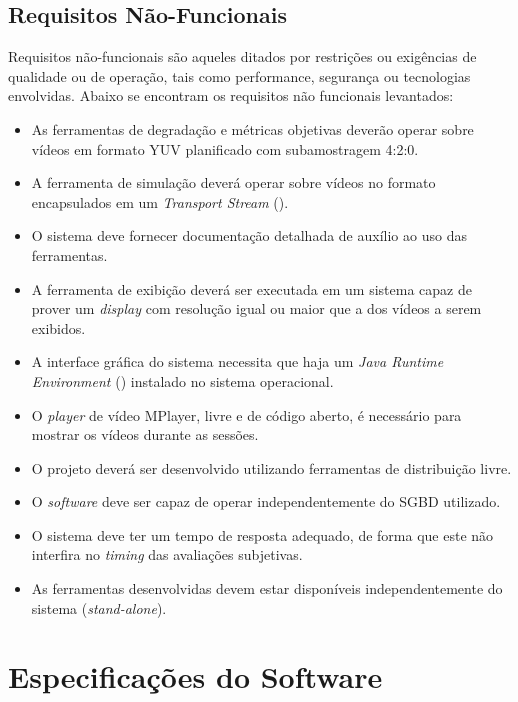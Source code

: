 \subsection{Requisitos Não-Funcionais}
\label{met:reqnaofunc}

Requisitos não-funcionais são aqueles ditados por restrições ou exigências de qualidade ou de operação, tais como performance, segurança ou tecnologias envolvidas.
Abaixo se encontram os requisitos não funcionais levantados:


\begin{itemize}
	\item As ferramentas de degradação e métricas objetivas deverão operar sobre vídeos em formato YUV planificado com subamostragem 4:2:0.
	\item A ferramenta de simulação deverá operar sobre vídeos no formato  encapsulados em um \emph{Transport Stream} ().
	\item O sistema deve fornecer documentação detalhada de auxílio ao uso das ferramentas.
	\item A ferramenta de exibição deverá ser executada em um sistema capaz de prover um \emph{display} com resolução igual ou maior que a dos vídeos a serem exibidos.
	\item A interface gráfica do sistema necessita que haja um \emph{Java Runtime Environment} () instalado no sistema operacional.
	\item O \emph{player} de vídeo MPlayer, livre e de código aberto, é necessário para mostrar os vídeos durante as sessões.
	\item O projeto deverá ser desenvolvido utilizando ferramentas de distribuição livre.
	\item O \emph{software} deve ser capaz de operar independentemente do SGBD utilizado.
	\item O sistema deve ter um tempo de resposta adequado, de forma que este não interfira no \emph{timing} das avaliações subjetivas.
	\item As ferramentas desenvolvidas devem estar disponíveis independentemente do sistema (\emph{stand-alone}).
\end{itemize}

\section{Especificações do Software}

